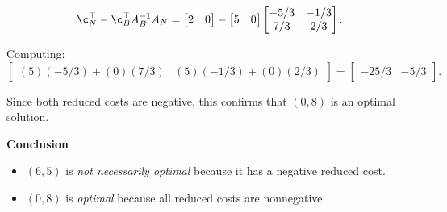 \begin{solution}
\begin{itemize}
\[
\c_N^\top -\c_B^\top A_B^{-1} A_N =
\begin{bmatrix}
    2 & 0
\end{bmatrix}
-
\begin{bmatrix}
    5 & 0
\end{bmatrix}
\begin{bmatrix}
    -5/3 & -1/3 \\
    7/3 & 2/3
\end{bmatrix}.
\]

Computing:
\[
\begin{bmatrix}
    (5)(-5/3) + (0)(7/3) & (5)(-1/3) + (0)(2/3)
\end{bmatrix}
=
\begin{bmatrix}
    -25/3 & -5/3
\end{bmatrix}.
\]
\end{itemize}
Since both reduced costs are negative, this confirms that $(0,8)$ is an optimal solution.

\textbf{Conclusion}
\begin{itemize}
\item \( (6,5) \) is \emph{not necessarily optimal} because it has a negative reduced cost.
\item \( (0,8) \) is \emph{optimal} because all reduced costs are nonnegative.
\end{itemize}
\end{solution}

